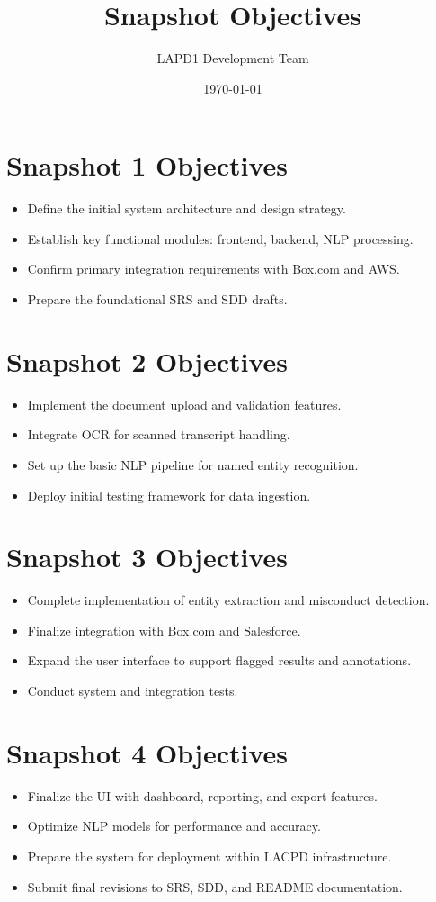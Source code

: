 \documentclass[12pt]{article}
\title{Snapshot Objectives}
\author{LAPD1 Development Team}
\date{\today}
\begin{document}
\maketitle

\section*{Snapshot 1 Objectives}
\begin{itemize}[label=--]
    \item Define the initial system architecture and design strategy.
    \item Establish key functional modules: frontend, backend, NLP processing.
    \item Confirm primary integration requirements with Box.com and AWS.
    \item Prepare the foundational SRS and SDD drafts.
\end{itemize}

\section*{Snapshot 2 Objectives}
\begin{itemize}[label=--]
    \item Implement the document upload and validation features.
    \item Integrate OCR for scanned transcript handling.
    \item Set up the basic NLP pipeline for named entity recognition.
    \item Deploy initial testing framework for data ingestion.
\end{itemize}

\section*{Snapshot 3 Objectives}
\begin{itemize}[label=--]
    \item Complete implementation of entity extraction and misconduct detection.
    \item Finalize integration with Box.com and Salesforce.
    \item Expand the user interface to support flagged results and annotations.
    \item Conduct system and integration tests.
\end{itemize}

\section*{Snapshot 4 Objectives}
\begin{itemize}[label=--]
    \item Finalize the UI with dashboard, reporting, and export features.
    \item Optimize NLP models for performance and accuracy.
    \item Prepare the system for deployment within LACPD infrastructure.
    \item Submit final revisions to SRS, SDD, and README documentation.
\end{itemize}
\end{document}
